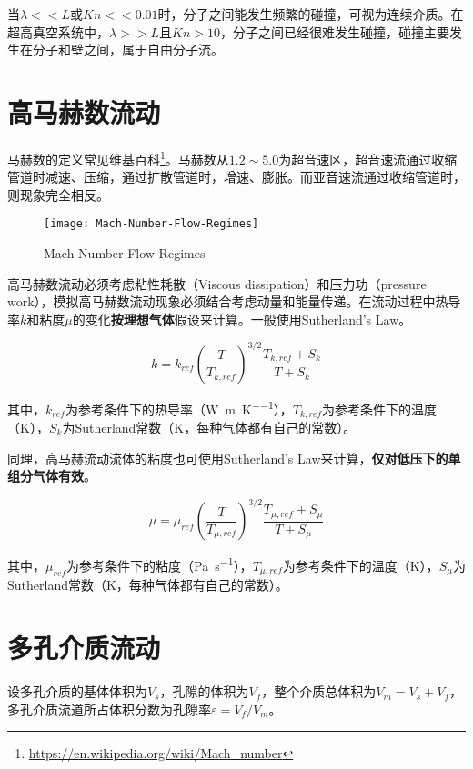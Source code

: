 当$ \lambda<<L $或$ Kn<<0.01 $时，分子之间能发生频繁的碰撞，可视为连续介质。在超高真空系统中，$ \lambda>>L $且$ Kn>10 $，分子之间已经很难发生碰撞，碰撞主要发生在分子和壁之间，属于自由分子流。

\section{高马赫数流动}
马赫数的定义常见维基百科\footnote{\url{https://en.wikipedia.org/wiki/Mach_number}}。马赫数从$ 1.2\sim5.0 $为超音速区，超音速流通过收缩管道时减速、压缩，通过扩散管道时，增速、膨胀。而亚音速流通过收缩管道时，则现象完全相反。

\begin{figure}[h]
    \centering
    \texttt{[image: Mach-Number-Flow-Regimes]}
    \caption{Mach-Number-Flow-Regimes}
\end{figure}

高马赫数流动必须考虑粘性耗散（Viscous dissipation）和压力功（pressure work），模拟高马赫数流动现象必须结合考虑动量和能量传递。在流动过程中热导率$ k $和粘度$ \mu $的变化\textbf{按理想气体}假设来计算。一般使用Sutherland's Law。

\begin{equation}
k = k_{ref}\left( \frac{T}{T_{k,ref}} \right)^{3/2}\frac{T_{k,ref}+S_k}{T+S_k}
\end{equation}

其中，$ k_{ref} $为参考条件下的热导率（\si{\watt\per\meter\per\kelvin}），$ T_{k,ref} $为参考条件下的温度（\si{\kelvin}），$ S_k $为Sutherland常数（\si{\kelvin}，每种气体都有自己的常数）。

同理，高马赫流动流体的粘度也可使用Sutherland's Law来计算，\textbf{仅对低压下的单组分气体有效}。

\begin{equation}
\mu = \mu_{ref}\left( \frac{T}{T_{\mu,ref}} \right)^{3/2}\frac{T_{\mu,ref}+S_\mu}{T+S_\mu}
\end{equation}

其中，$ \mu_{ref} $为参考条件下的粘度（\si{\pascal\per\second}），$ T_{\mu,ref} $为参考条件下的温度（\si{\kelvin}），$ S_\mu $为Sutherland常数（\si{\kelvin}，每种气体都有自己的常数）。

\section{多孔介质流动}

设多孔介质的基体体积为$ V_s $，孔隙的体积为$ V_f $，整个介质总体积为$ V_m = V_s + V_f $，多孔介质流道所占体积分数为孔隙率$ \varepsilon=V_f/V_m $。

